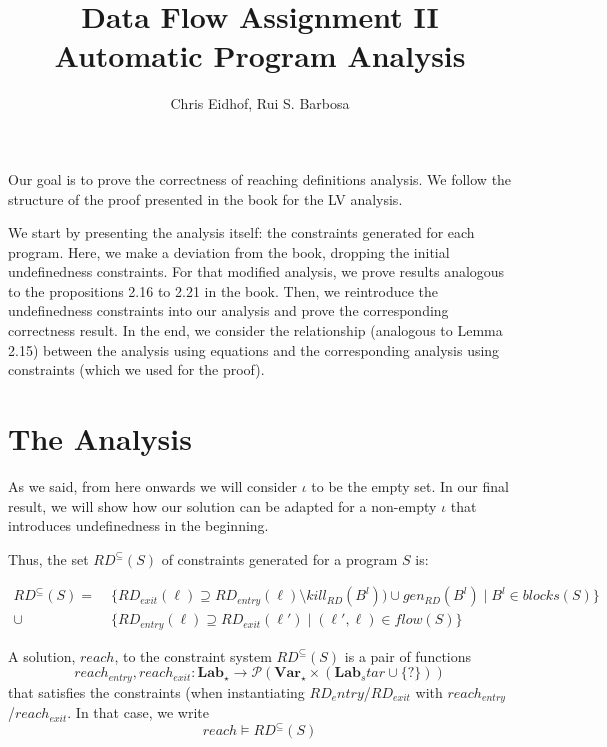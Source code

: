 \documentclass[a4wide,12pt]{article}
\theoremstyle{definition}
\theoremstyle{plain}
\theoremstyle{remark}
\def\pset#1{\mathcal{P}(#1)}
\def\Lab {\mathbf{Lab}}
\def\Var {\mathbf{Var}}
\begin{document}
\author{Chris Eidhof, Rui S. Barbosa}
\title{Data Flow Assignment II \\ Automatic Program Analysis}
 
\maketitle

Our goal is to prove the correctness of reaching definitions analysis.
We follow the structure of the proof presented in the book for the LV analysis.

We start by presenting the analysis itself: the constraints generated for each program. Here,
we make a deviation from the book, dropping the initial undefinedness constraints. For that
modified analysis, we prove results analogous to the propositions 2.16 to 2.21 in the book.
Then, we reintroduce the undefinedness constraints into our analysis and prove the corresponding
correctness result. In the end, we consider the relationship (analogous to Lemma 2.15)
between the analysis using equations and
the corresponding analysis using constraints (which we used for the proof).

\section{The Analysis}

As we said, from here onwards we will consider $\iota$ to be the empty set. In our final result, we
will show how our solution can be adapted for a non-empty $\iota$ that introduces
undefinedness in the beginning.

Thus, the set $RD^\subseteq(S)$ of constraints generated for a program $S$ is:

\begin{align} 
\label{def_constr}
RD^{\subseteq}(S) = & \; \{RD_{exit}(\ell) \supseteq RD_{entry}(\ell) \setminus kill_{RD}(B^l)) \cup gen_{RD}(B^l) \mid B^l \in blocks(S)\} \\
\cup & \; \{RD_{entry}(\ell) \supseteq RD_{exit}(\ell') \mid (\ell', \ell) \in flow(S) \}
\end{align}

A solution, $reach$, to the constraint system $RD^\subseteq(S)$ is a pair of functions
\[reach_{entry}, reach_{exit} : \Lab_\star \to \pset{\Var_\star \times (\Lab_star \cup \{?\})}\] 
that satisfies the constraints (when instantiating $RD_entry$/$RD_{exit}$ with $reach_{entry}$/$reach_{exit}$.
In that case, we write
\[reach \models RD^{\subseteq}(S)\]
\end{document}
